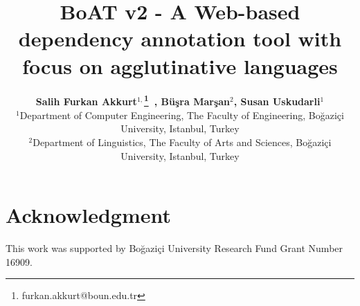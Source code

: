 \documentclass{elektr}
\title{BoAT v2 - A Web-based dependency annotation tool with focus on agglutinative languages}
\author[AKKURT et al.]{
\textbf{Salih Furkan Akkurt$^{1,}$\thanks{furkan.akkurt@boun.edu.tr}~, Büşra Marşan$^{2}$, Susan Uskudarli$^{1}$}\\
$^{1}$Department of Computer Engineering, The Faculty of Engineering, Boğaziçi University, Istanbul, Turkey\\
$^{2}$Department of Linguistics, The Faculty of Arts and Sciences, Boğaziçi University, Istanbul, Turkey
\\ [1.8em]

\rec{.202}
\acc{.202}
\finv{..202}
}
\begin{document}
\maketitle











\section*{Acknowledgment}
This work was supported by Boğaziçi University Research Fund Grant Number 16909.




\newpage
\appendix

\end{document}
